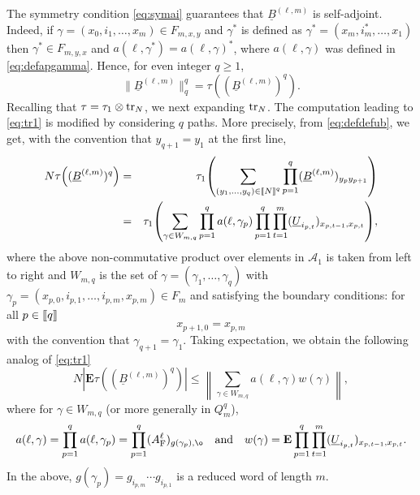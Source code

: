 \documentclass[11pt]{article}
\renewcommand{\star}{{\mathrm{F}}}
\newcommand{\cA}{\mathcal{A}}
\newcommand{\tr}{{\rm tr}}
\newcommand{\dE}{\mathbf {E}}
\newcommand{\ABS}[1]{{{\left| #1 \right|}}} %
\newcommand{\NRM}[1]{{{\left\| #1\right\|}}} %
\newcommand{\PAR}[1]{{{\left(#1\right)}}} %
\newcommand{\AND}{\quad \mathrm{and} \quad}
\newcommand{\1}{1\!\!{\sf I}}
\newcommand{\INT}[1]{{{\left[\hspace{-1.4pt}\left[#1\right]\hspace{-1.4pt}\right]}}}
\begin{document}
The symmetry condition \eqref{eq:symai} guarantees that $\underline B^{(\ell,m)}$ is self-adjoint. Indeed, if $\gamma  =(x_0,i_1,\ldots,x_m) \in F_{m,x,y}$ and $\gamma^*$ is defined as $\gamma^* = (x_m,i_m^*,\ldots,x_1)$ then $\gamma^* \in F_{m,y,x}$ and $a(\ell,\gamma^*) = a(\ell,\gamma)^*$, where $a(\ell,\gamma)$ was defined in \eqref{eq:defapgamma}.  Hence, for even integer $q \geq 1$,
$$
 \| \underline B^{(\ell,m)} \|_{q}^{q} = \tau \PAR{ ( \underline B^{(\ell,m)})^{q}} .
$$ 
Recalling that $\tau = \tau_1 \otimes \tr_N$, we next expanding $\tr_N$. The computation leading to \eqref{eq:tr1} is modified by considering $q$ paths. More precisely,  from \eqref{eq:defdefub}, we get, with the convention that $y_{q+1} = y_1$ at the first line,
\begin{eqnarray*}
N \tau \PAR{ ( \underline B^{(\ell,m)})^{q}} 
 & =  &   \tau_1 \PAR{ \sum_{( y_1,\ldots, y_{q}) \in \INT{N}^{q}}   \prod_{p =1}^{q} ( \underline B^{(\ell,m)})_{y_{p} y_{p+1}} } \\
 & = &  \tau_1 \PAR{ \sum_{\gamma \in W_{m,q}} \prod_{p=1}^{q}  a(\ell,\gamma_p ) \prod_{p=1}^{q} \prod_{t=1}^{m} (\underline U_{i_{p,t}} )_{x_{p,t-1},x_{p,t}}   },
 \end{eqnarray*}
where the above non-commutative product over elements in $\cA_1$ is taken from left to right  and $W_{m,q}$ is the set of $\gamma = (\gamma_1,\ldots, \gamma_q)$ with $\gamma_p = (x_{p,0},i_{p,1},\ldots,i_{p,m},x_{p,m}) \in F_m$ and satisfying the boundary conditions: for all $p \in \INT{q}$
\begin{equation}\label{eq:boundary}
x_{{p+1},0} = x_{p,m} 
\end{equation}
with the convention that $\gamma_{q+1} = \gamma_1$. Taking expectation, we obtain the following analog of \eqref{eq:tr1}
\begin{equation}\label{eq:tr1P}
N \ABS{\dE  \tau \PAR{ ( \underline B^{(\ell,m)})^{q}} } \leq \NRM{\sum_{\gamma \in W_{m,q}}   a(\ell,\gamma)w(\gamma) },
\end{equation}
where for $\gamma \in W_{m,q}$ (or more generally in $Q_m^q$),
\begin{equation}\label{eq:defapgammaP}
a(\ell,\gamma) = \prod_{p=1}^{q}  a(\ell,\gamma_p ) = \prod_{p=1}^q (A_{\star}^\ell)_{g(\gamma_p),\o}  \AND w(\gamma) = \dE \prod_{p=1}^{q} \prod_{t=1}^{m} (\underline U_{i_{p,t}} )_{x_{p,t-1},x_{p,t}}.
\end{equation}
In the above, $g(\gamma_p) = g_{i_{p,m}} \cdots g_{i_{p,1}}$ is a reduced word of length $m$.
\end{document}
